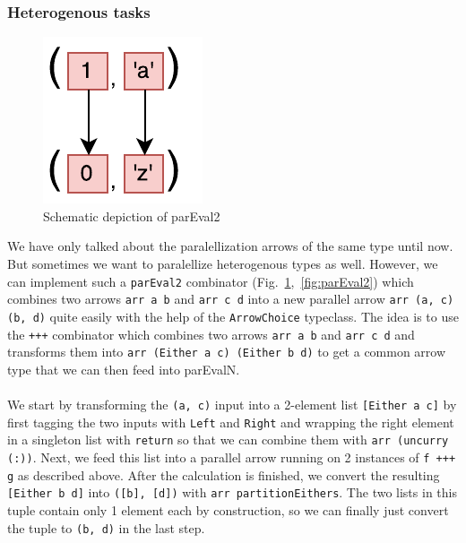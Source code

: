 \documentclass{jfp1}
\newcommand{\inlinecode}[1]{\texttt{#1}}
\begin{document}
\subsubsection{Heterogenous tasks}
\begin{figure}[h]
	\includegraphics[scale=0.7]{images/parEval2}
	\caption{Schematic depiction of parEval2}
	\label{fig:parEval2Img}
\end{figure}
We have only talked about the paralellization arrows of the same type until now. But sometimes we want to paralellize heterogenous types as well. However, we can implement such a \inlinecode{parEval2} combinator (Fig.~\ref{fig:parEval2Img},~\ref{fig:parEval2}) which combines two arrows \inlinecode{arr a b} and \inlinecode{arr c d} into a new parallel arrow \inlinecode{arr (a, c) (b, d)} quite easily with the help of the \inlinecode{ArrowChoice} typeclass. The idea is to use the \inlinecode{+++} combinator which combines two arrows \inlinecode{arr a b} and \inlinecode{arr c d} and transforms them into \inlinecode{arr (Either a c) (Either b d)} to get a common arrow type that we can then feed into parEvalN.
\\\\
We start by transforming the \inlinecode{(a, c)} input into a 2-element list \inlinecode{[Either a c]} by first tagging the two inputs with \inlinecode{Left} and \inlinecode{Right} and wrapping the right element in a singleton list with \inlinecode{return} so that we can combine them with \inlinecode{arr (uncurry (:))}. Next, we feed this list into a parallel arrow running on 2 instances of \inlinecode{f +++ g} as described above. After the calculation is finished, we convert the resulting \inlinecode{[Either b d]} into \inlinecode{([b], [d])} with \inlinecode{arr partitionEithers}. The two lists in this tuple contain only 1 element each by construction, so we can finally just convert the tuple to \inlinecode{(b, d)} in the last step.
\end{document}
